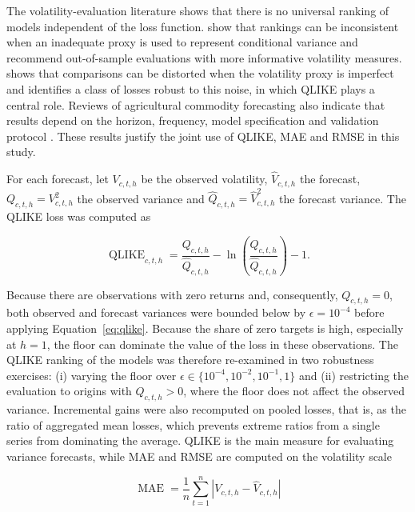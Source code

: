 \documentclass[a4paper,fleqn]{cas-sc}
\begin{document}
The volatility-evaluation literature shows that there is no universal ranking of models independent of the loss function. \citet{HansenLunde2006ConsistentRanking} show that rankings can be inconsistent when an inadequate proxy is used to represent conditional variance and recommend out-of-sample evaluations with more informative volatility measures. \citet{Patton2011VolatilityProxy} shows that comparisons can be distorted when the volatility proxy is imperfect and identifies a class of losses robust to this noise, in which QLIKE plays a central role. Reviews of agricultural commodity forecasting also indicate that results depend on the horizon, frequency, model specification and validation protocol \citep{Guindani2024AgriculturalForecasting}. These results justify the joint use of QLIKE, MAE and RMSE in this study.

For each forecast, let \(V_{c,t,h}\) be the observed volatility, \(\widehat{V}_{c,t,h}\) the forecast, \(Q_{c,t,h}=V_{c,t,h}^{2}\) the observed variance and \(\widehat{Q}_{c,t,h}=\widehat{V}_{c,t,h}^{2}\) the forecast variance. The QLIKE loss was computed as

\begin{equation}
\operatorname{QLIKE}_{c,t,h}
=
\frac{Q_{c,t,h}}{\widehat{Q}_{c,t,h}}
-\ln\left(\frac{Q_{c,t,h}}{\widehat{Q}_{c,t,h}}\right)-1.
\label{eq:qlike}
\end{equation}

Because there are observations with zero returns and, consequently, \(Q_{c,t,h}=0\), both observed and forecast variances were bounded below by \(\epsilon=10^{-4}\) before applying Equation~\ref{eq:qlike}. Because the share of zero targets is high, especially at \(h=1\), the floor can dominate the value of the loss in these observations. The QLIKE ranking of the models was therefore re-examined in two robustness exercises: (i) varying the floor over \(\epsilon\in\{10^{-4},10^{-2},10^{-1},1\}\) and (ii) restricting the evaluation to origins with \(Q_{c,t,h}>0\), where the floor does not affect the observed variance. Incremental gains were also recomputed on pooled losses, that is, as the ratio of aggregated mean losses, which prevents extreme ratios from a single series from dominating the average. QLIKE is the main measure for evaluating variance forecasts, while MAE and RMSE are computed on the volatility scale

\begin{equation}
\operatorname{MAE}
=
\frac{1}{n}\sum_{t=1}^{n}
\left\lvert V_{c,t,h}-\widehat{V}_{c,t,h}\right\rvert
\label{eq:mae}
\end{equation}
\end{document}
